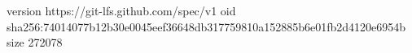 version https://git-lfs.github.com/spec/v1
oid sha256:74014077b12b30e0045eef36648db317759810a152885b6e01fb2d4120e6954b
size 272078
